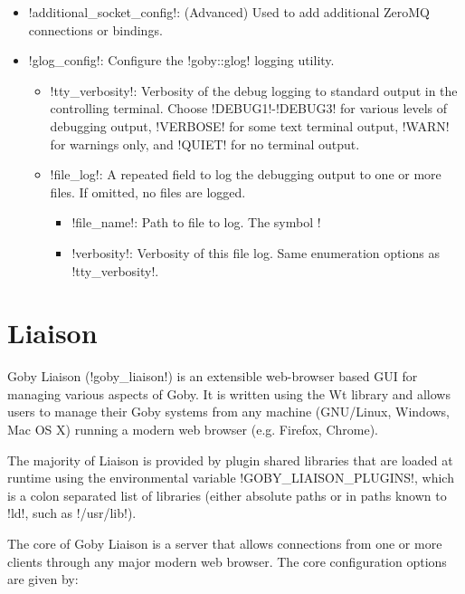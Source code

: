 \begin{itemize}
\begin{itemize}
\begin{itemize}
\end{itemize}
\end{itemize}
\item !additional_socket_config!: (Advanced) Used to add additional ZeroMQ connections or bindings. 
\item !glog_config!: Configure the !goby::glog! logging utility. 
\begin{itemize}
\item !tty_verbosity!: Verbosity of the debug logging to standard output in the controlling terminal. Choose !DEBUG1!-!DEBUG3! for various levels of debugging output, !VERBOSE! for some text terminal output, !WARN! for warnings only, and !QUIET! for no terminal output.
\item !file_log!: A repeated field to log the debugging output to one or more files. If omitted, no files are logged.
\begin{itemize}
\item !file_name!: Path to file to log. The symbol !%
\item !verbosity!: Verbosity of this file log. Same enumeration options as  !tty_verbosity!.
\end{itemize}
\end{itemize}
\end{itemize}

\section{Liaison}

Goby Liaison (!goby_liaison!) is an extensible web-browser based GUI for managing various aspects of Goby. It is written using the Wt \cite{wt} library and allows users to manage their Goby systems from any machine (GNU/Linux, Windows, Mac OS X) running a modern web browser (e.g. Firefox, Chrome).

The majority of Liaison is provided by plugin shared libraries that are loaded at runtime using the environmental variable !GOBY_LIAISON_PLUGINS!, which is a colon separated list of libraries (either absolute paths or in paths known to !ld!, such as !/usr/lib!).

The core of Goby Liaison is a server that allows connections from one or more clients through any major modern web browser. The core configuration options are given by:

\resetbvlinenumber

